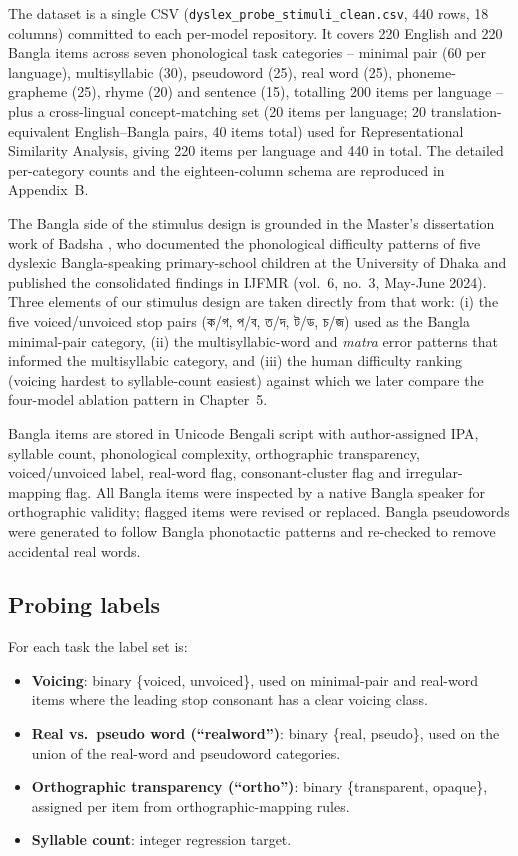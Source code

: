 The dataset is a single CSV (\texttt{dyslex\_probe\_stimuli\_clean.csv}, 440 rows, 18 columns) committed to each per-model repository. It covers 220 English and 220 Bangla items across seven phonological task categories -- minimal pair (60 per language), multisyllabic (30), pseudoword (25), real word (25), phoneme-grapheme (25), rhyme (20) and sentence (15), totalling 200 items per language -- plus a cross-lingual concept-matching set (20 items per language; 20 translation-equivalent English--Bangla pairs, 40 items total) used for Representational Similarity Analysis, giving 220 items per language and 440 in total. The detailed per-category counts and the eighteen-column schema are reproduced in Appendix~B.

The Bangla side of the stimulus design is grounded in the Master's dissertation work of Badsha \cite{badsha2024mall}, who documented the phonological difficulty patterns of five dyslexic Bangla-speaking primary-school children at the University of Dhaka and published the consolidated findings in IJFMR (vol.\ 6, no.\ 3, May-June 2024). Three elements of our stimulus design are taken directly from that work: (i) the five voiced/unvoiced stop pairs ({\banglafont ক/গ}, {\banglafont প/ব}, {\banglafont ত/দ}, {\banglafont ট/ড}, {\banglafont চ/জ}) used as the Bangla minimal-pair category, (ii) the multisyllabic-word and \textit{matra} error patterns that informed the multisyllabic category, and (iii) the human difficulty ranking (voicing hardest to syllable-count easiest) against which we later compare the four-model ablation pattern in Chapter~5.

Bangla items are stored in Unicode Bengali script with author-assigned IPA, syllable count, phonological complexity, orthographic transparency, voiced/unvoiced label, real-word flag, consonant-cluster flag and irregular-mapping flag. All Bangla items were inspected by a native Bangla speaker for orthographic validity; flagged items were revised or replaced. Bangla pseudowords were generated to follow Bangla phonotactic patterns and re-checked to remove accidental real words.

\subsection{Probing labels}

For each task the label set is:
\begin{itemize}
    \item \textbf{Voicing}: binary \{voiced, unvoiced\}, used on minimal-pair and real-word items where the leading stop consonant has a clear voicing class.
    \item \textbf{Real vs.\ pseudo word (``realword'')}: binary \{real, pseudo\}, used on the union of the real-word and pseudoword categories.
    \item \textbf{Orthographic transparency (``ortho'')}: binary \{transparent, opaque\}, assigned per item from orthographic-mapping rules.
    \item \textbf{Syllable count}: integer regression target.
\end{itemize}

